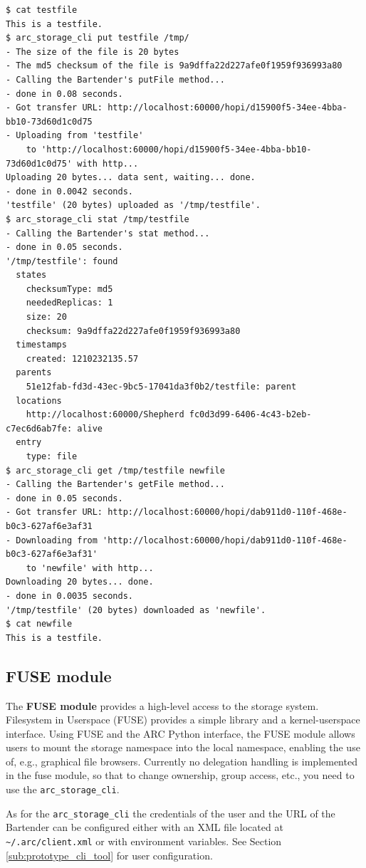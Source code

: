 \documentclass{book}
\begin{document}
\begin{verbatim}
$ cat testfile 
This is a testfile.
$ arc_storage_cli put testfile /tmp/
- The size of the file is 20 bytes
- The md5 checksum of the file is 9a9dffa22d227afe0f1959f936993a80
- Calling the Bartender's putFile method...
- done in 0.08 seconds.
- Got transfer URL: http://localhost:60000/hopi/d15900f5-34ee-4bba-bb10-73d60d1c0d75
- Uploading from 'testfile'
    to 'http://localhost:60000/hopi/d15900f5-34ee-4bba-bb10-73d60d1c0d75' with http...
Uploading 20 bytes... data sent, waiting... done.
- done in 0.0042 seconds.
'testfile' (20 bytes) uploaded as '/tmp/testfile'.
$ arc_storage_cli stat /tmp/testfile
- Calling the Bartender's stat method...
- done in 0.05 seconds.
'/tmp/testfile': found
  states
    checksumType: md5
    neededReplicas: 1
    size: 20
    checksum: 9a9dffa22d227afe0f1959f936993a80
  timestamps
    created: 1210232135.57
  parents
    51e12fab-fd3d-43ec-9bc5-17041da3f0b2/testfile: parent
  locations
    http://localhost:60000/Shepherd fc0d3d99-6406-4c43-b2eb-c7ec6d6ab7fe: alive
  entry
    type: file
$ arc_storage_cli get /tmp/testfile newfile
- Calling the Bartender's getFile method...
- done in 0.05 seconds.
- Got transfer URL: http://localhost:60000/hopi/dab911d0-110f-468e-b0c3-627af6e3af31
- Downloading from 'http://localhost:60000/hopi/dab911d0-110f-468e-b0c3-627af6e3af31'
    to 'newfile' with http...
Downloading 20 bytes... done.
- done in 0.0035 seconds.
'/tmp/testfile' (20 bytes) downloaded as 'newfile'.
$ cat newfile 
This is a testfile.
\end{verbatim}


\subsection{FUSE module} %
\label{sub:fuse_module}

The \textbf{FUSE module} provides a high-level access to the storage system. Filesystem in Userspace (FUSE) provides a simple library and a kernel-userspace interface. Using FUSE and the ARC Python interface, the FUSE module allows users to mount the storage namespace into the local namespace, enabling the use of, e.g., graphical file browsers. Currently no delegation handling is implemented in the fuse module, so that to change ownership, group access, etc., you need to use the \verb!arc_storage_cli!.

As for the \verb!arc_storage_cli! the credentials of the user and the URL of the Bartender can be configured either with an XML file located at \verb!~/.arc/client.xml! or with environment variables. See Section \ref{sub:prototype_cli_tool} for user configuration.
\end{document}
